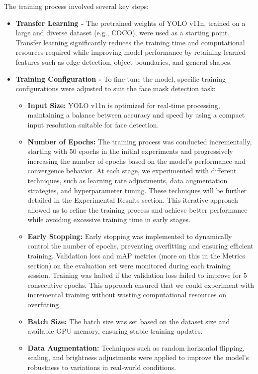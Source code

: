 \documentclass[11pt]{article}
\begin{document}
The training process involved several key steps:
    \begin{itemize}
        \item \textbf{Transfer Learning -}
        The pretrained weights of YOLO v11n, trained on a large and diverse dataset (e.g., COCO), were used as a starting point. Transfer learning significantly reduces the training time and computational resources required while improving model performance by retaining learned features such as edge detection, object boundaries, and general shapes.
        \item \textbf{Training Configuration -}
        To fine-tune the model, specific training configurations were adjusted to suit the face mask detection task:
            \begin{itemize}
                \item \textbf{Input Size:} YOLO v11n is optimized for real-time processing, maintaining a balance between accuracy and speed by using a compact input resolution suitable for face detection.
                \item \textbf{Number of Epochs:} The training process was conducted incrementally, starting with 50 epochs in the initial experiments and progressively increasing the number of epochs based on the model's performance and convergence behavior. At each stage, we experimented with different techniques, such as learning rate adjustments, data augmentation strategies, and hyperparameter tuning. These techniques will be further detailed in the Experimental Results section. This iterative approach allowed us to refine the training process and achieve better performance while avoiding excessive training time in early stages.
                \item \textbf{Early Stopping:} Early stopping was implemented to dynamically control the number of epochs, preventing overfitting and ensuring efficient training. Validation loss and mAP metrics (more on this in the Metrics section) on the evaluation set were monitored during each training session. Training was halted if the validation loss failed to improve for 5 consecutive epochs. This approach ensured that we could experiment with incremental training without wasting computational resources on overfitting.
                \item \textbf{Batch Size:} The batch size was set based on the dataset size and available GPU memory, ensuring stable training updates.
                \item \textbf{Data Augmentation:} Techniques such as random horizontal flipping, scaling, and brightness adjustments were applied to improve the model's robustness to variations in real-world conditions.

\end{itemize}
\end{itemize}
\end{document}
